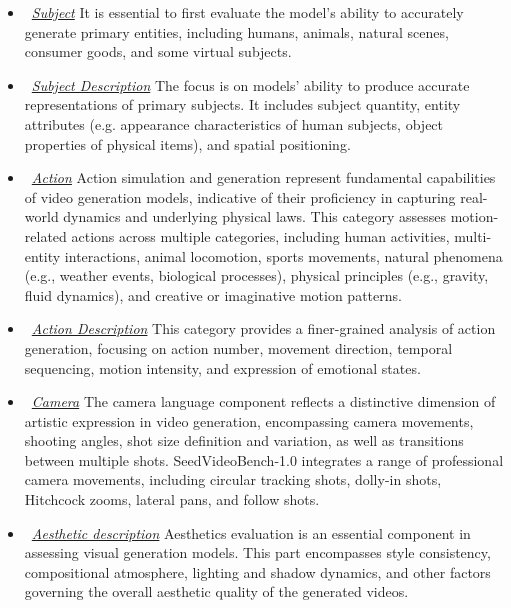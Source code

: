 \begin{itemize}[leftmargin=*]
\item ~\underline{\textit{Subject}} It is essential to first evaluate the model's ability to accurately generate primary entities, including humans, animals, natural scenes, consumer goods, and some virtual subjects.

\item ~\underline{\textit{Subject Description}} The focus is on models' ability to produce accurate representations of primary subjects. It includes subject quantity, entity attributes (e.g. appearance characteristics of human subjects, object properties of physical items), and spatial positioning.

\item ~\underline{\textit{Action}} Action simulation and generation represent fundamental capabilities of video generation models, indicative of their proficiency in capturing real-world dynamics and underlying physical laws. This category assesses motion-related actions across multiple categories, including human activities, multi-entity interactions, animal locomotion, sports movements, natural phenomena (e.g., weather events, biological processes), physical principles (e.g., gravity, fluid dynamics), and creative or imaginative motion patterns.

\item ~\underline{\textit{Action Description}} This category provides a finer-grained analysis of action generation, focusing on action number, movement direction, temporal sequencing, motion intensity, and expression of emotional states.

\item ~\underline{\textit{Camera}} The camera language component reflects a distinctive dimension of artistic expression in video generation, encompassing camera movements, shooting angles, shot size definition and variation, as well as transitions between multiple shots. SeedVideoBench-1.0 integrates a range of professional camera movements, including circular tracking shots, dolly-in shots, Hitchcock zooms, lateral pans, and follow shots.

\item ~\underline{\textit{Aesthetic description}} Aesthetics evaluation is an essential component in assessing visual generation models. This part encompasses style consistency, compositional atmosphere, lighting and shadow dynamics, and other factors governing the overall aesthetic quality of the generated videos.

\end{itemize}

